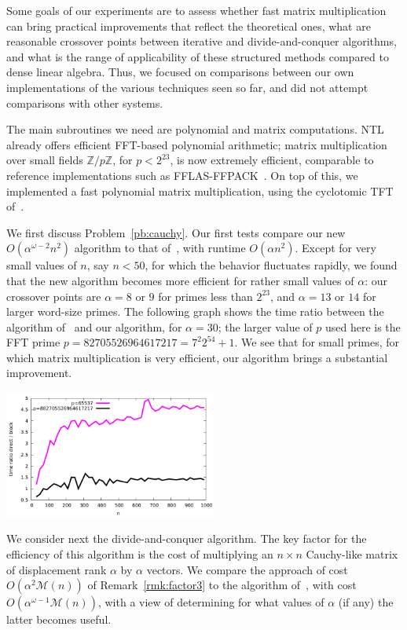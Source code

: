 \documentclass[sigconf]{acmart}
\newcommand{\Z}{\ensuremath{\mathbb{Z}}}
\newcommand{\M}{\ensuremath{\mathscr{M}}}
\theoremstyle{acmdefinition}
\begin{document}
Some goals of our experiments are to assess whether fast matrix
multiplication can bring practical improvements that reflect the
theoretical ones, what are reasonable crossover points between
iterative and divide-and-conquer algorithms, and what is the range of
applicability of these structured methods compared to dense linear
algebra.  Thus, we focused on comparisons between our own
implementations of the various techniques seen so far, and did not
attempt comparisons with other systems.

The main subroutines we need are polynomial and matrix
computations. NTL already offers efficient FFT-based polynomial
arithmetic; matrix multiplication over small fields $\Z/p\Z$, for $p <
2^{23}$, is now extremely efficient, comparable to reference
implementations such as FFLAS-FFPACK~\cite{fflas-ffpack}. On top of
this, we implemented a fast polynomial matrix multiplication, using
the cyclotomic TFT of~\cite{ArSc15}.

We first discuss Problem~\ref{pb:cauchy}. Our first tests compare our
new $O(\alpha^{\omega-2} n^2)$ algorithm to that
of~\cite{Mouilleron08}, with runtime $O(\alpha n^2)$. Except for very
small values of $n$, say $n < 50$, for which the behavior fluctuates
rapidly, we found that the new algorithm becomes more efficient for
rather small values of $\alpha$: our crossover points are $\alpha=8$
or $9$ for primes less than $2^{23}$, and $\alpha=13$ or $14$ for
larger word-size primes. The following graph shows the time ratio
between the algorithm of~\cite{Mouilleron08} and our algorithm, for
$\alpha=30$; the larger value of $p$ used here is the FFT prime
$p=82705526964617217=7^2 2^{54}+1$. We see that for small primes, for
which matrix multiplication is very efficient, our algorithm brings a
substantial improvement.

\includegraphics[width=7cm]{ratio-block-eschost-desktop.pdf}

We consider next the divide-and-conquer algorithm. The key factor for
the efficiency of this algorithm is the cost of multiplying an $n
\times n$ Cauchy-like matrix of displacement rank $\alpha$ by $\alpha$
vectors. We compare the approach of cost $O(\alpha^2 \M(n))$ of
Remark~\ref{rmk:factor3} to the algorithm of~\cite{BoJeMoSc16}, with
cost $O(\alpha^{\omega-1} \M(n))$, with a view of determining for what
values of $\alpha$ (if any) the latter becomes useful.
\end{document}
